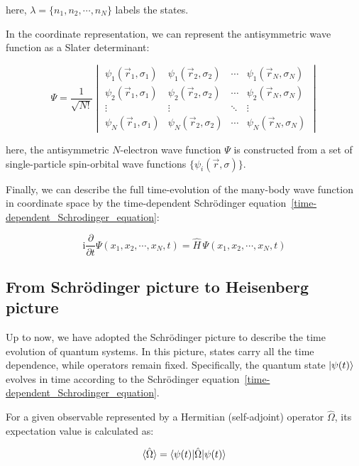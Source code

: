 here, $\lambda=\{n_1,n_2,\cdots,n_N\}$ labels the states.

In the coordinate representation, we can represent the antisymmetric wave function as a Slater determinant:

\begin{equation}
    \Psi = \frac{1}{\sqrt{N!}}
    \begin{vmatrix}
    \psi_1(\vec{r}_1,\sigma_1) & \psi_1(\vec{r}_2,\sigma_2) & \cdots & \psi_1(\vec{r}_N,\sigma_N)\\
    \psi_2(\vec{r}_1,\sigma_1) & \psi_2(\vec{r}_2,\sigma_2) & \cdots & \psi_2(\vec{r}_N,\sigma_N)\\
    \vdots & \vdots & \ddots & \vdots\\
    \psi_N(\vec{r}_1,\sigma_1) & \psi_N(\vec{r}_2,\sigma_2) & \cdots & \psi_N(\vec{r}_N,\sigma_N)
    \end{vmatrix}
\label{slater_determinant}
\end{equation}

here, the antisymmetric $N$-electron wave function $\Psi$ is constructed from a set of single-particle spin-orbital wave functions $\{\psi_i(\vec{r},\sigma)\}$.

Finally, we can describe the full time-evolution of the many-body wave function in coordinate space by the time-dependent Schrödinger equation~\eqref{time-dependent_Schrodinger_equation}:

\begin{equation}
    \mathrm{i}\frac{\partial}{\partial t}\Psi(x_1,x_2,\cdots,x_N,t)
    = \hat{H}\,\Psi(x_1,x_2,\cdots,x_N,t)
\label{tdse_manybody_coord}
\end{equation}

\subsection{From Schrödinger picture to Heisenberg picture}

Up to now, we have adopted the Schrödinger picture to describe the time evolution of quantum systems. In this picture, states carry all the time dependence, while operators remain fixed. Specifically, the quantum state $\ket{\psi(t)}$ evolves in time according to the Schrödinger equation~\eqref{time-dependent_Schrodinger_equation}.

For a given observable represented by a Hermitian (self-adjoint) operator $\hat{\Omega}$, its expectation value is calculated as:

\begin{equation}
    \braket{\hat{\Omega}} = \braket{\psi(t)|\hat{\Omega}|\psi(t)}
\label{expectation_Hermitian}
\end{equation}

